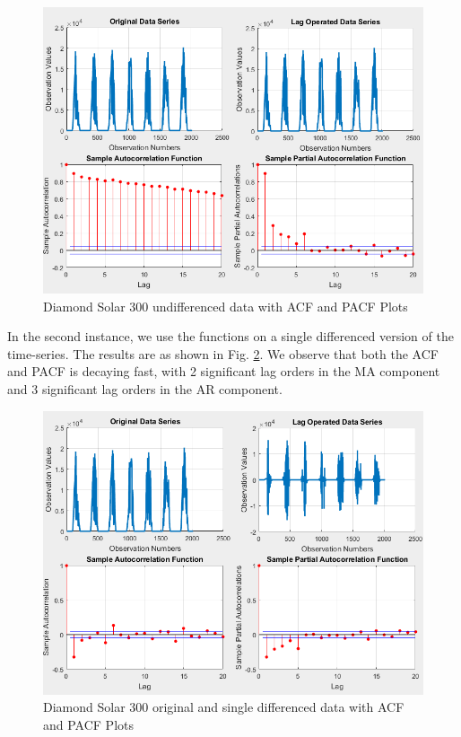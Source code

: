 \documentclass[journal]{IEEEtran}
\begin{document}
\begin{figure}[htpb]
	\centering
	\includegraphics[scale=0.4]{Undifferenced_5Min_Diamond300.png}
	\caption{Diamond Solar 300 undifferenced data with ACF and PACF Plots}
	\label{fig9} %
\end{figure}

In the second instance, we use the functions on a single differenced version of the time-series. The results are as shown in Fig. \ref{fig10}. We observe that both the ACF and PACF is decaying fast, with 2 significant lag orders in the MA component and 3 significant lag orders in the AR component.

\begin{figure}[htpb]
	\centering
	\includegraphics[scale=0.4]{SingleLag_5Min_Diamond300.png}
	\caption{Diamond Solar 300 original and single differenced data with ACF and PACF Plots}
	\label{fig10} %
\end{figure}
\end{document}
